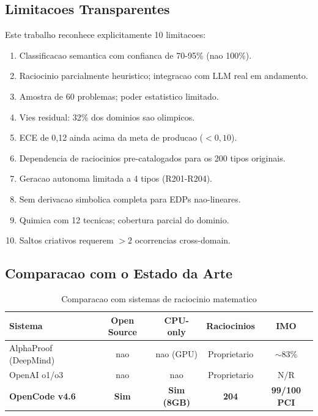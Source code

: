 \documentclass[5p]{elsarticle}
\begin{document}
\subsection{Limitacoes Transparentes}

Este trabalho reconhece explicitamente 10 limitacoes:

\begin{enumerate}[label=(\arabic*)]
 \item Classificacao semantica com confianca de 70-95\% (nao 100\%).
 \item Raciocinio parcialmente heuristico; integracao com LLM real em andamento.
 \item Amostra de 60 problemas; poder estatistico limitado.
 \item Vies residual: 32\% dos dominios sao olimpicos.
 \item ECE de 0,12 ainda acima da meta de producao ($<0,10$).
 \item Dependencia de raciocinios pre-catalogados para os 200 tipos originais.
 \item Geracao autonoma limitada a 4 tipos (R201-R204).
 \item Sem derivacao simbolica completa para EDPs nao-lineares.
 \item Quimica com 12 tecnicas; cobertura parcial do dominio.
 \item Saltos criativos requerem $>2$ ocorrencias cross-domain.
\end{enumerate}

\subsection{Comparacao com o Estado da Arte}

\begin{table}[H]
 \centering
 \caption{Comparacao com sistemas de raciocinio matematico}
 \label{tab:sota}
 \footnotesize
 \begin{tabular}{lcccc}
 \toprule
 \textbf{Sistema} & \textbf{Open Source} & \textbf{CPU-only} & \textbf{Raciocinios} & \textbf{IMO}\\
 \midrule
 AlphaProof (DeepMind) & nao & nao (GPU) & Proprietario & $\sim$83\%\\
 OpenAI o1/o3 & nao & nao & Proprietario & N/R\\
 \rowcolor{greenbg}
 \textbf{OpenCode v4.6} & \textbf{Sim} & \textbf{Sim (8GB)} & \textbf{204} & \textbf{99/100 PCI}\\
 \bottomrule
 \end{tabular}
\end{table}
\end{document}

